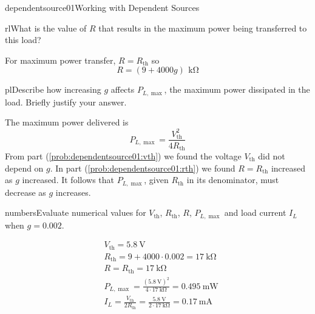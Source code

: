 \begin{mainquestion}{dependentsource01}{Working with Dependent Sources}
\begin{partquestion}{rl}{What is the value of $R$ that results in the maximum power being transferred to this load?}
\begin{answer}
For maximum power transfer, $R=R_{\mathrm{th}}$ so
\[
R=(9+4000g)\,\qty{}{\kilo\ohm}
\]
\end{answer}
\end{partquestion}

\begin{partquestion}{pl}{Describe how increasing $g$ affects $P_{L,\max}$, the maximum power dissipated in the load.  Briefly justify your answer.}
\begin{answer}
The maximum power delivered is
\[
P_{L,\max}= \frac{V_{\mathrm{th}}^2}{4R_{\mathrm{th}}}
\]
From part (\cref{prob:dependentsource01:vth}) we found the voltage $V_{\mathrm{th}}$ did not depend on $g$. In part (\cref{prob:dependentsource01:rth}) we found $R=R_{\mathrm{th}}$ increased as $g$ increased.  It follows that $P_{L,\max}$, given $R_{\mathrm{th}}$ in its denominator, must decrease as $g$ increases.
\end{answer}
\end{partquestion}

\begin{partquestion}{numbers}{Evaluate numerical values for $V_\mathrm{th}$, $R_\mathrm{th}$, $R$, $P_{L,\max}$ and load current $I_L$ when $g=0.002$.}
\begin{answer}
\begin{align*}
&V_{\mathrm{th}}=\qty{5.8}{\volt}\\
&R_{\mathrm{th}}=9+4000\cdot0.002=\qty{17}{\kilo\ohm}\\
&R=R_{\mathrm{th}}=\qty{17}{\kilo\ohm}\\
&P_{L,\max}= \frac{(\qty{5.8}{\volt})^2}{4\cdot\qty{17}{\kilo\ohm}}=\qty{0.495}{\milli\watt}\\
&I_L=\frac{V_{\mathrm{th}}}{2R_{\mathrm{th}}}=\frac{\qty{5.8}{\volt}}{2\cdot\qty{17}{\kilo\ohm}}=\qty{0.17}{\milli\ampere}
\end{align*}
\end{answer}
\end{partquestion}


\end{mainquestion}
